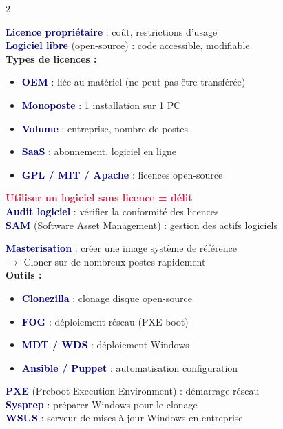 \documentclass[a4paper,10pt]{article}
\newcommand{\key}[1]{\textbf{\textcolor{navy}{#1}}}
\newcommand{\warn}[1]{\textbf{\textcolor{crimson}{#1}}}
\begin{document}
\begin{multicols}{2}
\begin{tcolorbox}[basebox, colframe=orange, title=7. Gestion des licences logicielles]
\key{Licence propriétaire} : coût, restrictions d'usage \\
\key{Logiciel libre} (open-source) : code accessible, modifiable \\[4pt]
\textbf{Types de licences :}
\begin{itemize}
  \item \key{OEM} : liée au matériel (ne peut pas être transférée)
  \item \key{Monoposte} : 1 installation sur 1 PC
  \item \key{Volume} : entreprise, nombre de postes
  \item \key{SaaS} : abonnement, logiciel en ligne
  \item \key{GPL / MIT / Apache} : licences open-source
\end{itemize}
\vspace{4pt}
\warn{Utiliser un logiciel sans licence = délit} \\
\key{Audit logiciel} : vérifier la conformité des licences \\
\key{SAM} (Software Asset Management) : gestion des actifs logiciels
\end{tcolorbox}

\begin{tcolorbox}[basebox, colframe=purple, title=8. Masterisation et déploiement]
\key{Masterisation} : créer une image système de référence \\
\quad $\to$ Cloner sur de nombreux postes rapidement \\[4pt]
\textbf{Outils :}
\begin{itemize}
  \item \key{Clonezilla} : clonage disque open-source
  \item \key{FOG} : déploiement réseau (PXE boot)
  \item \key{MDT / WDS} : déploiement Windows
  \item \key{Ansible / Puppet} : automatisation configuration
\end{itemize}
\vspace{4pt}
\key{PXE} (Preboot Execution Environment) : démarrage réseau \\
\key{Sysprep} : préparer Windows pour le clonage \\
\key{WSUS} : serveur de mises à jour Windows en entreprise
\end{tcolorbox}


\end{multicols}
\end{document}
